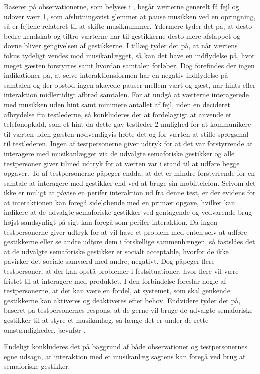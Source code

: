 Baseret på observationerne, som belyses i , begår værterne generelt få fejl og udover vært 1, som afslutningsvist glemmer at pause musikken ved en opringning, så er fejlene relateret til at skifte musiknummer. Ydermere tyder det på, at desto bedre kendskab og tiltro værterne har til gestikkerne desto mere afslappet og dovne bliver gengivelsen af gestikkerne. I tillæg tyder det på, at når værtens fokus tydeligt vendes mod musikanlægget, så kan det have en indflydelse på, hvor meget gæsten forstyrres samt hvordan samtalen forløber. Dog forefindes der ingen indikationer på, at selve interaktionsformen har en negativ indflydelse på samtalen og der opstod ingen akavede pauser mellem vært og gæst, når hints eller interaktion midlertidigt afbrød samtalen. For at undgå at værterne interagerede med musikken uden hint samt minimere antallet af fejl, uden en decideret afbrydelse fra testlederne, så konkluderes det at fordelagtigt at anvende et telefonopkald, som et hint da dette gav testleder 2 mulighed for at kommunikere til værten uden gæsten nødvendigvis hørte det og for værten at stille spørgsmål til testlederen.\blankline
%
Ingen af testpersonerne giver udtryk for at det var forstyrrende at interagere med musikanlægget via de udvalgte semaforiske gestikker og alle testpersoner giver tilmed udtryk for at værten var i stand til at udføre begge opgaver. To af testpersonerne påpeger endda, at det er mindre forstyrrende for en samtale at interagere med gestikker end ved at bruge sin mobiltelefon. Selvom det ikke er muligt at påvise en perifer interaktion ud fra denne test, er der evidens for at interaktionen kan foregå sideløbende med en primær opgave, hvilket kan indikere at de udvalgte semaforiske gestikker ved gentagende og vedvarende brug højst sandsynligt på sigt kan foregå som perifer interaktion. \blankline
%
Da ingen testpersonerne giver udtryk for at vil have et problem med enten selv at udføre gestikkerne eller se andre udføre dem i forskellige sammenhængen, så fastslåes det at de udvalgte semaforiske gestikker er socialt acceptable, hvorfor de ikke påvirker det sociale samværd med andre, negativt. Dog påpeger flere testpersoner, at der kan opstå problemer i festsituationer, hvor flere vil være fristet til at interagere med produktet. I den forbindelse foreslår nogle af testpersonerne, at det kan være en fordel, at systemet, som skal genkende gestikkerne kan aktiveres og deaktiveres efter behov. Endvidere tyder det på, baseret på testpersonernes respons, at de gerne vil bruge de udvalgte semaforiske gestikker til at styre et musikanlæg, så længe det er under de rette omstændigheder, jævnfør .  

Endeligt konkluderes det på baggrund af både observationer og testpersonernes egne udsagn, at interaktion med et musikanlæg sagtens kan foregå ved brug af semaforiske gestikker.



